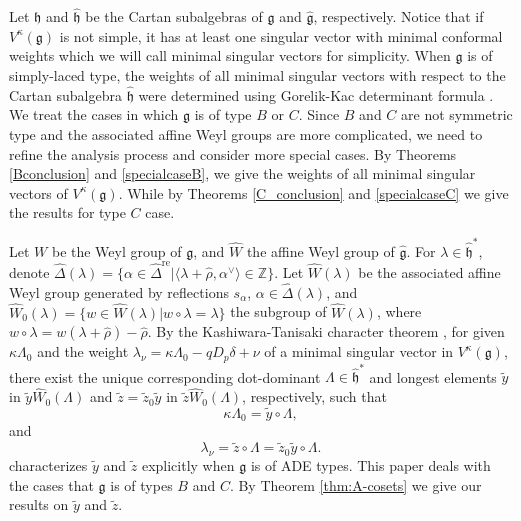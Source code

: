 \documentclass[11pt,a4paper]{amsart}
\newcommand{\ZZ}{\mathbb Z}
\theoremstyle{plain}
\numberwithin{equation}{section}
\begin{document}
Let $\mathfrak{h}$ and $\widehat{\mathfrak{h}}$ be the Cartan subalgebras of $\mathfrak{g}$ and $\widehat{\mathfrak{g}}$, respectively. Notice that  if $V^\kappa(\mathfrak{g})$ is not simple, it has at least one singular vector with minimal conformal weights which we will  call minimal singular vectors for simplicity.  When $\mathfrak{g}$ is of simply-laced type,  the weights of all minimal singular vectors  with respect to the Cartan subalgebra $\widehat{\mathfrak{h}}$ 
were determined using Gorelik-Kac determinant formula \cite{JS26}.  We treat the cases in which $\mathfrak{g}$ is of type $B$ or $C$.  Since $B$ and $C$ are not symmetric type and the associated affine Weyl groups  are more complicated, we need to refine the analysis process and consider more special cases. By Theorems  \ref{Bconclusion} and \ref{specialcaseB}, we give the  weights of all minimal singular vectors of $V^\kappa(\mathfrak{g})$. While by Theorems  \ref{C_conclusion} and \ref{specialcaseC} we give  the results for type  $C$ case. 


Let $W$ be the Weyl group of $\mathfrak{g}$, and 
$\widehat{W}$  the affine Weyl group of $\widehat{\mathfrak{g}}$. For $\lambda\in\widehat{\mathfrak{h}}^*$, denote $\widehat\Delta(\lambda)=\{\alpha\in\widehat\Delta^{\mathrm{re}}|\langle\lambda+\widehat\rho,\alpha^\vee\rangle\in{\ZZ}\}$.  Let $\widehat{W}(\lambda)$ be the associated affine Weyl group generated by reflections $s_{\alpha}$, $\alpha\in \widehat\Delta(\lambda)$, and $\widehat{W}_0(\lambda)=\{w\in \widehat{W}(\lambda)|w\circ\lambda=\lambda\}$ the subgroup of 
$\widehat{W}(\lambda)$, where $w\circ \lambda=w(\lambda+\widehat\rho)-\widehat\rho$.  By the Kashiwara-Tanisaki character theorem \cite{KT00}, for given 
$\kappa\Lambda_0$ and the weight   $\lambda_{\nu}=\kappa\Lambda_0-qD_p\delta+\nu$ of a minimal singular vector in $V^{\kappa}(\mathfrak{g})$, there exist the unique corresponding dot-dominant $\Lambda\in{\widehat{\mathfrak h}}^*$ and longest  elements $\widetilde{y}$ in $\widetilde{y}\widehat{W}_0(\Lambda)$ and $\widetilde{z}=\widetilde{z}_0\widetilde{y}$ in  $\widetilde{z}\widehat{W}_0(\Lambda)$, respectively, 
such that  $$\kappa\Lambda_0=\widetilde{y}\circ\Lambda,$$
and 
$$\lambda_{\nu}=\widetilde{z}\circ \Lambda=\widetilde{z}_0\widetilde{y}\circ \Lambda.$$
\cite{JS26} characterizes $\widetilde{y}$ and $\widetilde{z}$ explicitly when $\mathfrak{g}$ is of ADE types. This paper deals with the cases that $\mathfrak{g}$ is of types $B$ and $C$. By Theorem \ref{thm:A-cosets} we give our results on $\widetilde{y}$ and $\widetilde{z}$. 
\end{document}
